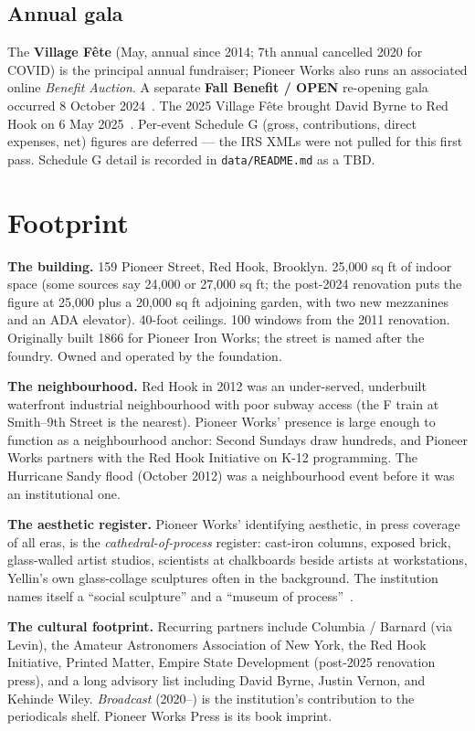 \documentclass[10pt,letterpaper,twocolumn]{article}
\begin{document}
\subsection{Annual gala}

The \textbf{Village F\^ete} (May, annual since 2014; 7th annual cancelled 2020 for COVID) is the principal annual fundraiser; Pioneer Works also runs an associated online \emph{Benefit Auction}. A separate \textbf{Fall Benefit / OPEN} re-opening gala occurred 8 October 2024~\citep{surface2024gala}. The 2025 Village F\^ete brought David Byrne to Red Hook on 6 May 2025~\citep{artnews2025fete}. Per-event Schedule G (gross, contributions, direct expenses, net) figures are deferred --- the IRS XMLs were not pulled for this first pass. Schedule G detail is recorded in \texttt{data/README.md} as a TBD.

\section{Footprint}

\textbf{The building.} 159 Pioneer Street, Red Hook, Brooklyn. 25{,}000 sq ft of indoor space (some sources say 24{,}000 or 27{,}000 sq ft; the post-2024 renovation puts the figure at 25{,}000 plus a 20{,}000 sq ft adjoining garden, with two new mezzanines and an ADA elevator). 40-foot ceilings. 100 windows from the 2011 renovation. Originally built 1866 for Pioneer Iron Works; the street is named after the foundry. Owned and operated by the foundation.

\textbf{The neighbourhood.} Red Hook in 2012 was an under-served, underbuilt waterfront industrial neighbourhood with poor subway access (the F train at Smith--9th Street is the nearest). Pioneer Works' presence is large enough to function as a neighbourhood anchor: Second Sundays draw hundreds, and Pioneer Works partners with the Red Hook Initiative on K-12 programming. The Hurricane Sandy flood (October 2012) was a neighbourhood event before it was an institutional one.

\textbf{The aesthetic register.} Pioneer Works' identifying aesthetic, in press coverage of all eras, is the \emph{cathedral-of-process} register: cast-iron columns, exposed brick, glass-walled artist studios, scientists at chalkboards beside artists at workstations, Yellin's own glass-collage sculptures often in the background. The institution names itself a ``social sculpture'' and a ``museum of process''~\citep{fvf2017pioneer}.

\textbf{The cultural footprint.} Recurring partners include Columbia / Barnard (via Levin), the Amateur Astronomers Association of New York, the Red Hook Initiative, Printed Matter, Empire State Development (post-2025 renovation press), and a long advisory list including David Byrne, Justin Vernon, and Kehinde Wiley. \emph{Broadcast} (2020--) is the institution's contribution to the periodicals shelf. Pioneer Works Press is its book imprint.
\end{document}
